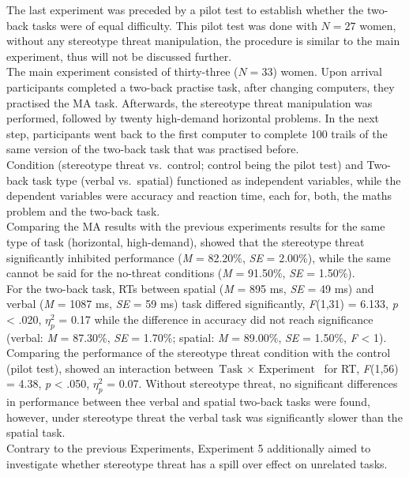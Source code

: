 \documentclass[
  stu]{apa7}
\begin{document}
The last experiment was preceded by a pilot test to establish whether the two-back tasks were of equal difficulty.
This pilot test was done with \(N = 27\) women, without any stereotype threat manipulation, the procedure is similar to the main experiment, thus will not be discussed further.\\
The main experiment consisted of thirty-three (\(N = 33\)) women.
Upon arrival participants completed a two-back practise task, after changing computers, they practised the MA task.
Afterwards, the stereotype threat manipulation was performed, followed by twenty high-demand horizontal problems.
In the next step, participants went back to the first computer to complete 100 trails of the same version of the two-back task that was practised before.\\
Condition (stereotype threat vs.~control; control being the pilot test) and Two-back task type (verbal vs.~spatial) functioned as independent variables, while the dependent variables were accuracy and reaction time, each for, both, the maths problem and the two-back task.\\
Comparing the MA results with the previous experiments results for the same type of task (horizontal, high-demand), showed that the stereotype threat significantly inhibited performance (\emph{M} = 82.20\%, \emph{SE} = 2.00\%), while the same cannot be said for the no-threat conditions (\emph{M} = 91.50\%, \emph{SE} = 1.50\%).\\
For the two-back task, RTs between spatial (\emph{M} = 895 ms, \emph{SE} = 49 ms) and verbal (\emph{M} = 1087 ms, \emph{SE} = 59 ms) task differed significantly, \emph{F}(1,31) = 6.133, \emph{p} \textless{} .020, \(\eta^{2}_{p}\) = 0.17 while the difference in accuracy did not reach significance (verbal: \emph{M} = 87.30\%, \emph{SE} = 1.70\%; spatial: \emph{M} = 89.00\%, \emph{SE} = 1.50\%, \emph{F} \textless{} 1).
Comparing the performance of the stereotype threat condition with the control (pilot test), showed an interaction between \(\text{Task } \times \text{ Experiment }\) for RT, \emph{F}(1,56) = 4.38, \emph{p} \textless{} .050, \(\eta^{2}_{p}\) = 0.07.
Without stereotype threat, no significant differences in performance between thee verbal and spatial two-back tasks were found, however, under stereotype threat the verbal task was significantly slower than the spatial task.\\
Contrary to the previous Experiments, Experiment 5 additionally aimed to investigate whether stereotype threat has a spill over effect on unrelated tasks.
\end{document}
